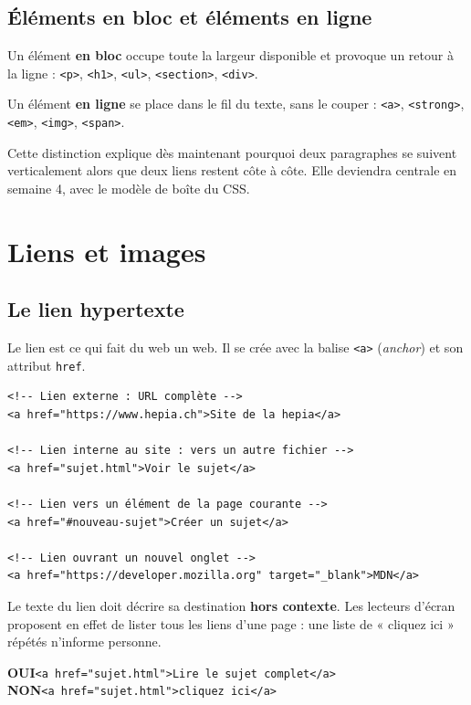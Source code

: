 \documentclass[a4paper,11pt]{article}
\begin{document}
\subsection{Éléments en bloc et éléments en ligne}

\begin{tcolorbox}[definition, title={Définition --- Bloc et en ligne}]
Un élément \textbf{en bloc} occupe toute la largeur disponible et provoque un retour à la ligne : \texttt{<p>}, \texttt{<h1>}, \texttt{<ul>}, \texttt{<section>}, \texttt{<div>}.

\vspace{3pt}
Un élément \textbf{en ligne} se place dans le fil du texte, sans le couper : \texttt{<a>}, \texttt{<strong>}, \texttt{<em>}, \texttt{<img>}, \texttt{<span>}.
\end{tcolorbox}

Cette distinction explique dès maintenant pourquoi deux paragraphes se suivent verticalement alors que deux liens restent côte à côte. Elle deviendra centrale en semaine 4, avec le modèle de boîte du CSS.

\section{Liens et images}

\subsection{Le lien hypertexte}

Le lien est ce qui fait du web un web. Il se crée avec la balise \texttt{<a>} (\textit{anchor}) et son attribut \texttt{href}.

\begin{lstlisting}[language=HTML5, caption={Quatre types de liens}]
<!-- Lien externe : URL complète -->
<a href="https://www.hepia.ch">Site de la hepia</a>

<!-- Lien interne au site : vers un autre fichier -->
<a href="sujet.html">Voir le sujet</a>

<!-- Lien vers un élément de la page courante -->
<a href="#nouveau-sujet">Créer un sujet</a>

<!-- Lien ouvrant un nouvel onglet -->
<a href="https://developer.mozilla.org" target="_blank">MDN</a>
\end{lstlisting}

\begin{tcolorbox}[astuce, title={Écrire un bon intitulé de lien}]
Le texte du lien doit décrire sa destination \textbf{hors contexte}. Les lecteurs d'écran proposent en effet de lister tous les liens d'une page : une liste de « cliquez ici » répétés n'informe personne.

\vspace{3pt}
\textcolor{successGreen}{\textbf{OUI}}\quad \texttt{<a href="sujet.html">Lire le sujet complet</a>}\\[3pt]
\textcolor{alertRed}{\textbf{NON}}\quad \texttt{<a href="sujet.html">cliquez ici</a>}
\end{tcolorbox}
\end{document}

